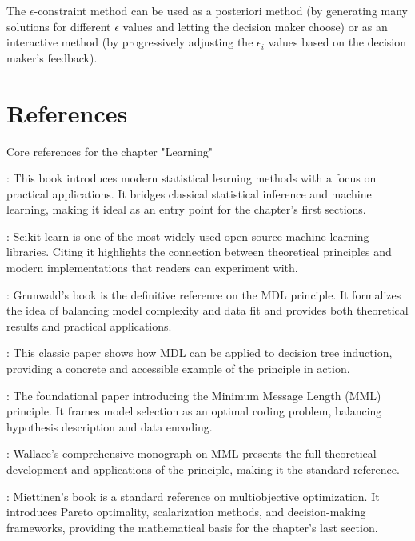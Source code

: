 The $\epsilon$-constraint method can be used as a posteriori method (by generating many solutions for different $\epsilon$ values and letting the decision maker choose) or as an interactive method (by progressively adjusting the $\epsilon_i$ values based on the decision maker’s feedback).

%
%

\section*{References}

Core references for the chapter "Learning"

\cite{james2013introduction}: This book introduces modern statistical learning methods with a focus on practical applications. It bridges classical statistical inference and machine learning, making it ideal as an entry point for the chapter’s first sections.

\cite{scikit-learn}: Scikit-learn is one of the most widely used open-source machine learning libraries. Citing it highlights the connection between theoretical principles and modern implementations  that readers can experiment with.

\cite{grunwald2007minimum}: Grunwald's book is the definitive reference on the MDL principle. It formalizes the idea of balancing model complexity and data fit and provides both theoretical results and practical applications.

\cite{quinlan1989inferring}: This classic paper shows how MDL can be applied to decision tree induction, providing a concrete and accessible example of the principle in action.

\cite{wallace1968information}: The foundational paper introducing the Minimum Message Length (MML) principle. It frames model selection as an optimal coding problem, balancing hypothesis description and data encoding.

\cite{wallace2005statistical}: Wallace’s comprehensive monograph on MML presents the full theoretical development and applications of the principle, making it the standard reference.

\cite{miettinen2012nonlinear}: Miettinen’s book is a standard reference on multiobjective optimization. It introduces Pareto optimality, scalarization methods, and decision-making frameworks, providing the mathematical basis for the chapter’s last section.